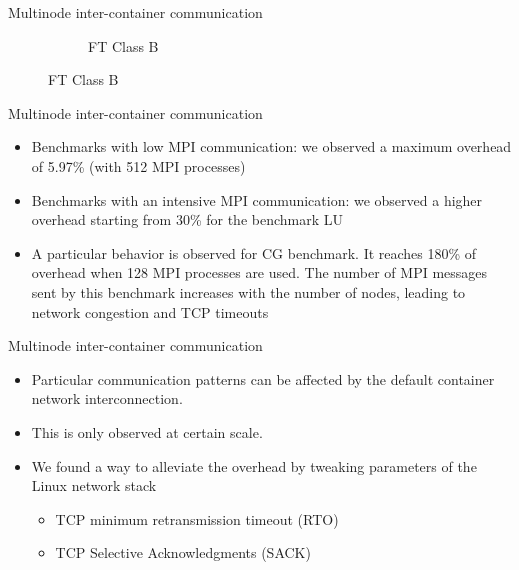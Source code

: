 \documentclass[presentation]{beamer}
\begin{document}
\begin{frame}[label=sec-3-7]{Multinode inter-container communication}
\begin{figure}
\begin{subfigure}[b]{0.42\textwidth}
    \caption{FT Class B}
  \end{subfigure}
\end{figure}
\end{frame}

\begin{frame}[label=sec-3-8]{Multinode inter-container communication}
\begin{itemize}
\item Benchmarks with low  MPI communication: we observed a maximum overhead of \alert{5.97\%} (with \alert{512 MPI processes})
\item Benchmarks with an intensive MPI communication: we observed a higher overhead starting from \alert{30\%} for the benchmark LU

\item A particular behavior is observed for CG benchmark.
It reaches \alert{180\%} of overhead when \alert{128} MPI processes are used.
The number of MPI messages sent by this benchmark increases with the number of nodes,
leading to network congestion and TCP timeouts
\end{itemize}
\end{frame}

\begin{frame}[label=sec-3-9]{Multinode inter-container communication}
\begin{itemize}
\item Particular communication patterns can be affected by
the default container network interconnection.

\item This is only observed at certain scale.

\item We found a way to alleviate the overhead
by tweaking parameters of the Linux network stack

\begin{itemize}
\item TCP minimum retransmission timeout (RTO)
\item TCP Selective Acknowledgments (SACK)
\end{itemize}
\end{itemize}
\end{frame}
\end{document}
